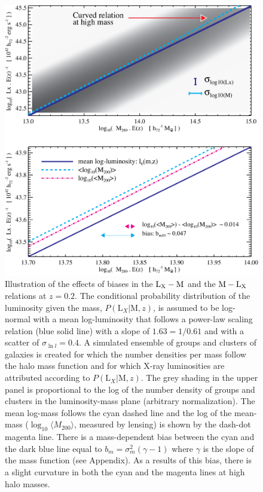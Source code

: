 \documentclass[12pt]{emulateapj}
\newcommand{\mlx}{$\rm{M} - \rm{L}_{\rm X}$ }
\newcommand{\lxm}{$\rm{L}_{\rm X} - \rm{M}$ }
\begin{document}
\begin{figure}[htb]
\centerline{\includegraphics[scale=0.53]{figure2.pdf}}
\caption{Illustration of the effects of biases in the \lxm and the
  \mlx relations at $z=0.2$. The conditional probability distribution
  of the luminosity given the mass, $P(\mathrm{L}_X|\mathrm{M},z)$, is
  assumed to be log-normal with a mean log-luminosity that follows a
  power-law scaling relation (blue solid line) with a slope of
  $1.63=1/0.61$ and with a scatter of $\sigma_{\ln l}=0.4$. A
  simulated ensemble of groups and clusters of galaxies is created for
  which the number densities per mass follow the
  \protect\citet{Tinker:2008} halo mass function and for which X-ray
  luminosities are attributed according to
  $P(\mathrm{L}_X|\mathrm{M},z)$. The grey shading in the upper panel
  is proportional to the log of the number density of groups and
  clusters in the luminosity-mass plane (arbitrary normalization). The
  mean log-mass follows the cyan dashed line and the log of the
  mean-mass ($\log_{10}\langle M_{200} \rangle$, measured by lensing)
  is shown by the dash-dot magenta line. There is a mass-dependent
  bias between the cyan and the dark blue line equal to
  $b_{m}=\sigma_{m}^2(\gamma-1)$ where $\gamma$ is the slope of the
  mass function (see Appendix). As a results of this bias, there is a
  slight curvature in both the cyan and the magenta lines at high halo
  masses.}
\label{bias_illustration}
\end{figure}
\end{document}

